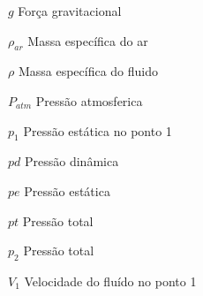 \begin{simbolos} \itemsep -1pt
	\item[$g$] Força gravitacional
	\item[$\rho_{ar}$] Massa específica do ar
	\item[$\rho$] Massa específica do fluido
	\item[$P_{atm}$] Pressão atmosferica
	\item[$p_{1}$] Pressão estática no ponto 1
	\item[$ pd $] Pressão dinâmica
	\item[$ pe $] Pressão estática
	\item[$ pt $] Pressão total
	\item[$p_{2}$] Pressão total 
	\item[$V_{1}$] Velocidade do fluído no ponto 1
\end{simbolos}
